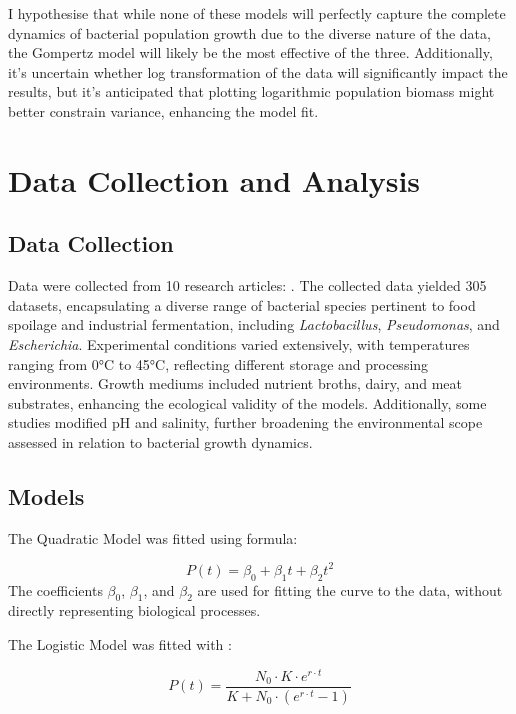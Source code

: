 \documentclass[11pt]{article}
\begin{document}
I hypothesise that while none of these models will perfectly capture the complete dynamics of bacterial population growth due to the diverse nature of the data, the Gompertz model will likely be the most effective of the three. Additionally, it's uncertain whether log transformation of the data will significantly impact the results, but it's anticipated that plotting logarithmic population biomass might better constrain variance, enhancing the model fit.


\newpage
\section*{Data Collection and Analysis}

\subsection*{Data Collection} 
Data were collected from 10 research articles: \cite{1Bae2014, 2Bernhardt2018, 3Galarz2016, 4Gill1991, 5Phillips1987, 6Roth1962, 7Silva, 8Sivonen, 9Stannard1985, 10Zwietering}. The collected data yielded 305 datasets, encapsulating a diverse range of bacterial species pertinent to food spoilage and industrial fermentation, including \textit{Lactobacillus}, \textit{Pseudomonas}, and \textit{Escherichia}. Experimental conditions varied extensively, with temperatures ranging from 0°C to 45°C, reflecting different storage and processing environments. Growth mediums included nutrient broths, dairy, and meat substrates, enhancing the ecological validity of the models. Additionally, some studies modified pH and salinity, further broadening the environmental scope assessed in relation to bacterial growth dynamics.

\subsection*{Models}

The Quadratic Model was fitted using formula:

\begin{equation}
P(t) = \beta_0 + \beta_1 t + \beta_2 t^2
\end{equation}
The coefficients \( \beta_0 \), \( \beta_1 \), and \( \beta_2 \) are used for fitting the curve to the data, without directly representing biological processes.


The Logistic Model was fitted with \parencite[]{Pla2015}: 

\begin{equation}
    P(t) = \frac{N_0 \cdot K \cdot e^{r \cdot t}}{K + N_0 \cdot (e^{r \cdot t} - 1)}
\end{equation}
\end{document}
